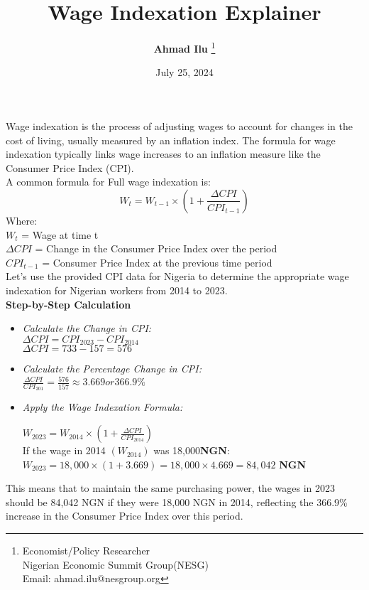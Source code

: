 \documentclass[14pt,a4paper]{article}
\title{\textbf{Wage Indexation Explainer}}
\author{\textbf{Ahmad Ilu} \thanks{Economist/Policy Researcher\\
Nigerian Economic Summit Group(NESG) \\
Email: ahmad.ilu@nesgroup.org}}
\date{July 25, 2024}
\begin{document}
\maketitle
Wage indexation is the process of adjusting wages to account for changes in the cost of living, usually measured by an inflation index. The formula for wage indexation typically links wage increases to an inflation measure like the Consumer Price Index (CPI).\\ 
 A common formula for Full wage indexation is:
\begin{equation}
 W_t = W_{t-1} \times \left(1 + \frac{\Delta CPI}{CPI_{t-1}}\right)
\label{eqn:full indexation} 
\end{equation}
Where: \\
$ W_t$ = Wage at time t  \\
$ \Delta CPI$  = Change in the Consumer Price Index over the period \\
$ CPI_{t-1}$  = Consumer Price Index at the previous time period \\
Let's use the provided CPI data for Nigeria to determine the appropriate wage indexation for Nigerian workers from 2014 to 2023. \\
\textbf{Step-by-Step Calculation} \\
\begin{itemize}
\item\textit{Calculate the Change in CPI:}   \\

$ \Delta CPI = CPI_{2023} - CPI_{2014} $ \\
$ \Delta CPI = 733 - 157 = 576 $ \\

\item \textit{Calculate the Percentage Change in CPI:} \\
$\frac{\Delta CPI}{CPI_{201}} = \frac{576}{157} \approx 3.669 or 366.9\% $ \\ 

\item \textit{Apply the Wage Indexation Formula:} 

  $ W_{2023} = W_{2014} \times (1 + \frac{\Delta CPI}{CPI_{2014}})$ \\
  If the wage in 2014 $(W_{2014})$ was 18,000\textbf{NGN}: \\
  $ W_{2023} = 18,000 \times (1 + 3.669)= 18,000 \times 4.669 = 84,042$      \textbf{NGN}\\  
  \end{itemize}
This means that to maintain the same purchasing power, the wages in 2023 should be 84,042 NGN if they were 18,000 NGN in 2014, reflecting the 366.9\% increase in the Consumer Price Index over this period. \\
\end{document}
